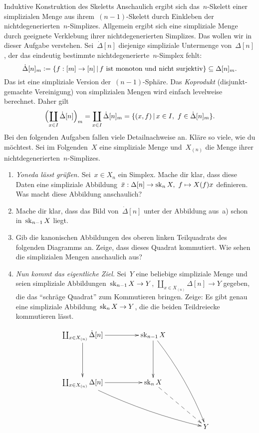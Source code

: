 \documentclass{uebblatt}
\begin{document}
\begin{aufgabe}{Induktive Konstruktion des Skeletts}
Anschaulich ergibt sich das~$n$-Skelett einer simplizialen Menge aus
ihrem~$(n-1)$-Skelett durch Einkleben der nichtdegenerierten~$n$-Simplizes.
Allgemein ergibt sich eine simpliziale Menge durch geeignete Verklebung
ihrer nichtdegenerierten Simplizes. Das wollen wir in dieser Aufgabe verstehen.
Sei~$\dot \Delta[n]$ diejenige simpliziale Untermenge von~$\Delta[n]$, der das
eindeutig bestimmte nichtdegenerierte~$n$-Simplex fehlt:
\[ \dot \Delta[n]_m \vcentcolon= \{ f : [m] \to [n] \,|\,
  \text{$f$ ist monoton und nicht surjektiv} \} \subseteq \Delta[n]_m. \]
Das ist eine simpliziale Version der~$(n-1)$-Sphäre.
Das \emph{Koprodukt} (disjunkt-gemachte Vereinigung) von simplizialen Mengen
wird einfach levelweise berechnet. Daher gilt
\[ \Bigl(\coprod_{x \in I} \dot\Delta[n]\Bigr)_m =
  \coprod_{x \in I} \dot\Delta[n]_m =
  \{ (x, f) \,|\, x \in I,\ f \in \dot\Delta[n]_m \}. \]
Bei den folgenden Aufgaben fallen viele Detailnachweise an. Kläre so viele, wie
du möchtest. Sei im Folgenden~$X$ eine simpliziale Menge und~$X_{(n)}$ die
Menge ihrer nichtdegenerierten~$n$-Simplizes.

\begin{enumerate}
\item \emph{Yoneda lässt grüßen.} Sei~$x \in X_n$ ein Simplex. Mache dir
klar, dass diese Daten eine simpliziale Abbildung~$\bar x : \Delta[n] \to \operatorname{sk}_n
X,\ f \mapsto X(f)x$ definieren. Was macht diese Abbildung anschaulich?

\item Mache dir klar, dass das Bild von~$\dot\Delta[n]$ unter der Abbildung
aus~a) schon in~$\operatorname{sk}_{n-1} X$ liegt.

\item Gib die kanonischen Abbildungen des oberen linken Teilquadrats des folgenden
Diagramms an. Zeige, dass dieses Quadrat kommutiert. Wie sehen die simplizialen
Mengen anschaulich aus?

\item \emph{Nun kommt das eigentliche Ziel.} Sei~$Y$ eine beliebige simpliziale
Menge und seien simpliziale Abbildungen~$\operatorname{sk}_{n-1}X \to Y$, $\coprod_{x \in
X_{(n)}} \Delta[n] \to Y$ gegeben, die das "`schräge Quadrat"' zum Kommutieren
bringen. Zeige: Es gibt genau eine simpliziale Abbildung~$\operatorname{sk}_n X \to Y$, die
die beiden Teildreiecke kommutieren lässt.

\[ \xymatrixcolsep{4pc}\xymatrixrowsep{4pc}\xymatrix{
  \coprod_{x \in X_{(n)}} \dot\Delta[n] \ar[r] \ar[d] &
  \sk_{n-1} X \ar[d] \ar@/^/[rdd] \\
  \coprod_{x \in X_{(n)}} \Delta[n] \ar[r] \ar@/_/[rrd] &
  \sk_n X \ar@{-->}[rd] \\
  && Y
} \]


\end{enumerate}
\end{aufgabe}
\end{document}
